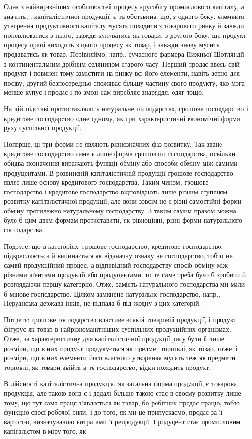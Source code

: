 
Одна з найвиразніших особливостей процесу кругобігу промислового
капіталу, а значить, і капіталістичної продукції, є та обставина, що, з
одного боку, елементи утворення продуктивного капіталу мусять походити
з товарового ринку й завжди поновлюватися з нього, завжди купуватись
як товари; з другого боку, що продукт процесу праці виходить з
цього процесу як товар, і завжди знову мусить продаватись як товар.
Порівняймо, напр., сучасного фармера Нижньої Шотляндії з континентальним
дрібним селянином старого часу. Перший продає ввесь свій
продукт і повинен тому замістити на ринку всі його елементи, навіть
зерно для посіву; другий безпосередньо споживає більшу частину свого
продукту, яко мога менше купує і продає і по змозі сам виробляє знаряддя,
одяг тощо.

На цій підставі протиставлялось натуральне господарство, грошове
господарство і кредитове господарство одне одному, як три характеристичні
економічні форми руху суспільної продукції.

Поперше, ці три форми не являють рівнозначних фаз розвитку. Так
зване кредитове господарство саме є лише форма грошового господарства,
оскільки обидва позначення виражають функції обміну або способи
обміну між самими продуцентами. В розвиненій капіталістичній продукції
грошове господарство являє лише основу кредитового господарства.
Таким чином, грошове господарство і кредитове господарство відповідають
лише різним ступеням розвитку капіталістичної продукції, але
вони зовсім не є різні самостійні форми обміну протилежно натуральному
господарству. З таким самим правом можна було б цим двом формам
протиставити, як рівноцінні, різні форми натурального господарства.

Подруге, що в категоріях: грошове господарство, кредитове господарство,
підкреслюється й випинається як відзначну ознаку не господарство,
тобто не самий продукційний процес, а відповідний господарству спосіб
обміну між різними аґентами продукції або продуцентами, то те саме
треба було б зробити й розглядаючи першу категорію. Отже, замість
натурального господарства ми мали б мінове господарство. Цілком замкнене
натуральне господарство, напр., Перуанська держава інків, не підпала
б під жодну з цих категорій.

Потретє: грошове господарство властиве всякій товаровій продукції, і
продукт фігурує як товар в найрізноманітніших суспільних продукційних
організмах. Отже, за характеристичну для капіталістичної продукції рису
були б лише розміри, що в них продукт продукується як предмет торговлі,
як товар, отже, і розміри, що в них елементи його власного утворення
мусять теж як предмети торговлі, як товари ввійти в те господарство,
відки походить продукт.

В дійсності капіталістична продукція, як загальна форма продукції,
є товарова продукція, але такою вона є і дедалі більше такою стає в
своєму розвитку лише тому, що тут сама праця з’являється як товар, бо
робітник продає працю, тобто функцію своєї робочої сили, і до того, як
ми це припускаємо, продає за її вартістю, визначуваною витратами її
репродукції. Продуцент стає промисловим капіталістом в міру того, як
\parbreak{}  %
